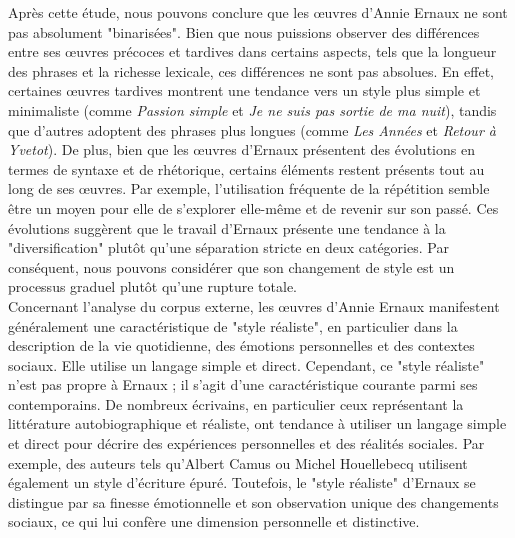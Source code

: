 Après cette étude, nous pouvons conclure que les œuvres d'Annie Ernaux ne sont pas absolument "binarisées". Bien que nous puissions observer des différences entre ses œuvres précoces et tardives dans certains aspects, tels que la longueur des phrases et la richesse lexicale, ces différences ne sont pas absolues. En effet, certaines œuvres tardives montrent une tendance vers un style plus simple et minimaliste (comme \textit{Passion simple} et \textit{Je ne suis pas sortie de ma nuit}), tandis que d'autres adoptent des phrases plus longues (comme \textit{Les Années} et \textit{Retour à Yvetot}). De plus, bien que les œuvres d'Ernaux présentent des évolutions en termes de syntaxe et de rhétorique, certains éléments restent présents tout au long de ses œuvres. Par exemple, l'utilisation fréquente de la répétition semble être un moyen pour elle de s'explorer elle-même et de revenir sur son passé. Ces évolutions suggèrent que le travail d'Ernaux présente une tendance à la "diversification" plutôt qu'une séparation stricte en deux catégories. Par conséquent, nous pouvons considérer que son changement de style est un processus graduel plutôt qu'une rupture totale.\\

Concernant l’analyse du corpus externe, les œuvres d’Annie Ernaux manifestent généralement une caractéristique de "style réaliste", en particulier dans la description de la vie quotidienne, des émotions personnelles et des contextes sociaux. Elle utilise un langage simple et direct. Cependant, ce "style réaliste" n’est pas propre à Ernaux ; il s'agit d'une caractéristique courante parmi ses contemporains. De nombreux écrivains, en particulier ceux représentant la littérature autobiographique et réaliste, ont tendance à utiliser un langage simple et direct pour décrire des expériences personnelles et des réalités sociales. Par exemple, des auteurs tels qu'Albert Camus ou Michel Houellebecq utilisent également un style d'écriture épuré. Toutefois, le "style réaliste" d'Ernaux se distingue par sa finesse émotionnelle et son observation unique des changements sociaux, ce qui lui confère une dimension personnelle et distinctive.\\

